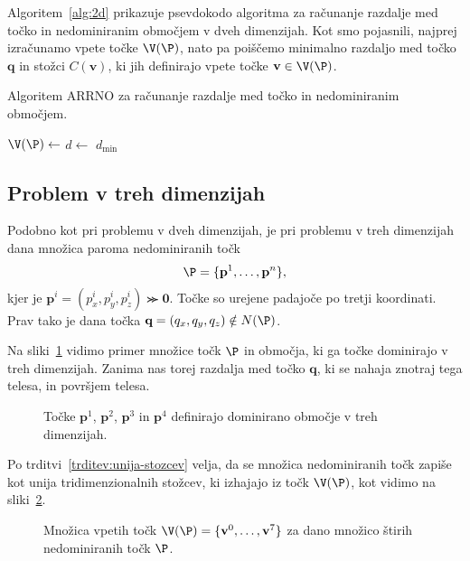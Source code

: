 Algoritem~\ref{alg:2d} prikazuje psevdokodo algoritma za računanje razdalje med točko in nedominiranim območjem v dveh dimenzijah. Kot smo pojasnili, najprej izračunamo vpete točke $\V(\P)$, nato pa poiščemo minimalno razdaljo med točko $\textbf{q}$ in stožci $C(\textbf{v})$, ki jih definirajo vpete točke $\textbf{v} \in \V(\P)$.
\begin{algorithm}[ht]
\caption{Algoritem ARRNO za računanje razdalje med točko in nedominiranim območjem.}
\begin{algorithmic}
\State $\V(\P) \gets$ 
    \State $d \gets$ 
    \EndIf
\EndFor
\State \Return $d_{\min}$
\EndFunction
\end{algorithmic}
\label{alg:2d}
\end{algorithm}


\subsection{Problem v treh dimenzijah}
Podobno kot pri problemu v dveh dimenzijah, je pri problemu v treh dimenzijah dana množica paroma nedominiranih točk 
\[
\P = \{\textbf{p}^1, \dots, \textbf{p}^n\},
\]
kjer je $\textbf{p}^i = (p^i_x, p^i_y, p^i_z) \ggcurly \textbf{0}$. Točke so urejene padajoče po tretji koordinati. Prav tako je dana točka $\textbf{q} = (q_x, q_y, q_z) \notin N(\P)$.

Na sliki~\ref{fig:points3d} vidimo primer množice točk $\P$ in območja, ki ga točke dominirajo v treh dimenzijah. Zanima nas torej razdalja med točko $\textbf{q}$, ki se nahaja znotraj tega telesa, in površjem telesa. 
\begin{figure}[htb]
  \centering
  
  \caption{Točke $\textbf{p}^1$, $\textbf{p}^2$, $\textbf{p}^3$ in $\textbf{p}^4$ definirajo dominirano območje v treh dimenzijah.}
  \label{fig:points3d}
\end{figure}

Po trditvi~\ref{trditev:unija-stozcev} velja, da se množica nedominiranih točk zapiše kot unija tridimenzionalnih stožcev, ki izhajajo iz točk $\V(\P)$, kot vidimo na sliki~\ref{fig:points3dkink}. 
\begin{figure}[htb]
  \centering
  
  \caption{Množica vpetih točk $\V(\P) = \{\textbf{v}^0, \dots, \textbf{v}^7\}$ za dano množico štirih nedominiranih točk $\P$.}
  \label{fig:points3dkink}
\end{figure}

